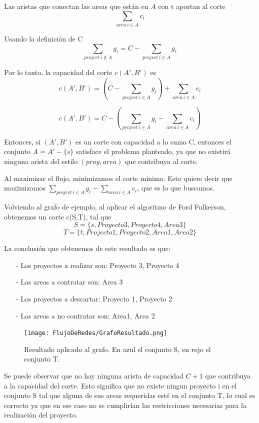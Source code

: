Las aristas que conectan las areas que están en $A$ con t aportan al corte
$$ \sum_{area\ i \in A} c_i $$

Usando la definición de C
$$ \sum_{project\ i \notin A} g_i = C - \sum_{project\ i \in A} g_i$$

Por lo tanto, la capacidad del corte $c(A',B')$ es
$$c(A',B') = \left( C - \sum_{project\ i \in A} g_i \right)+  \sum_{area\ i \in A} c_i $$

$$c(A',B') = C - \left(\sum_{project\ i \in A} g_i - \sum_{area\ i \in A} c_i \right)$$


Entonces, si $(A', B')$ es un corte con capacidad a lo sumo C, entonces el conjunto $A = A' -\{s\}$ satisface el problema planteado, ya que no existirá ninguna arista del estilo $(proy, area)$ que 
contribuya al corte.

Al maximizar el flujo, minimizamos el corte minimo. Esto quiere decir que maximizamos $\sum_{project\ i \in A} g_i - \sum_{area\ i \in A} c_i$, que es lo que buscamos.



Volviendo al grafo de ejemplo, al aplicar el algoritmo de Ford Fulkerson, obtenemos un corte c(S,T), tal que $$S = \{ s, Proyecto 3, Proyecto 4, Area 3\}$$ 
$$ T = \{ t, Projecto 1, Proyecto 2, Area 1, Area 2 \}$$

La conclusión que obtenemos de este resultado es que:
\begin{itemize}
 \item[-] Los proyectos a realizar son: Proyecto 3, Proyecto 4
 \item[-] Las areas a contratar son: Area 3
 \item[-] Los proyectos a descartar: Proyecto 1, Proyecto 2
 \item[-] Las areas a no contratar son: Area1, Area 2
\end{itemize}

\begin{figure}[H]
\centering
\texttt{[image: FlujoDeRedes/GrafoResultado.png]}
\caption{Resultado aplicado al grafo. En azul el conjunto S, en rojo el conjunto T.}
\end{figure}

Se puede observar que no hay ninguna arista de capacidad $C+1$ que contribuya a la capacidad del corte. Esto significa que no existe ningun proyecto i en el conjunto S tal que alguna de sus areas requeridas 
esté en el conjunto T, lo cual es correcto ya que en ese caso no se cumplirían las restricciones necesarias para la realización del proyecto.


